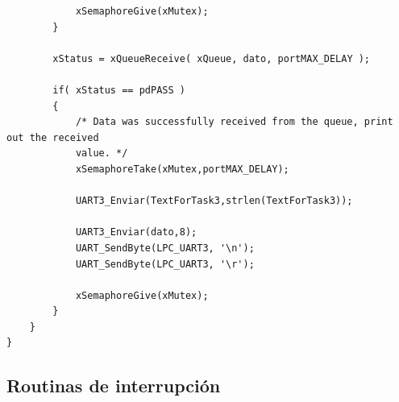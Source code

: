 \documentclass[a4paper,12pt]{article}
\begin{document}
\begin{itemize}
\begin{verbatim}
			xSemaphoreGive(xMutex);
		}

		xStatus = xQueueReceive( xQueue, dato, portMAX_DELAY );

		if( xStatus == pdPASS )
		{
			/* Data was successfully received from the queue, print out the received
			value. */
			xSemaphoreTake(xMutex,portMAX_DELAY);

			UART3_Enviar(TextForTask3,strlen(TextForTask3));

			UART3_Enviar(dato,8);
			UART_SendByte(LPC_UART3, '\n');
			UART_SendByte(LPC_UART3, '\r');

			xSemaphoreGive(xMutex);
		}
	}
}
\end{verbatim}
\end{itemize}

\subsection{Routinas de interrupción}
\end{document}
